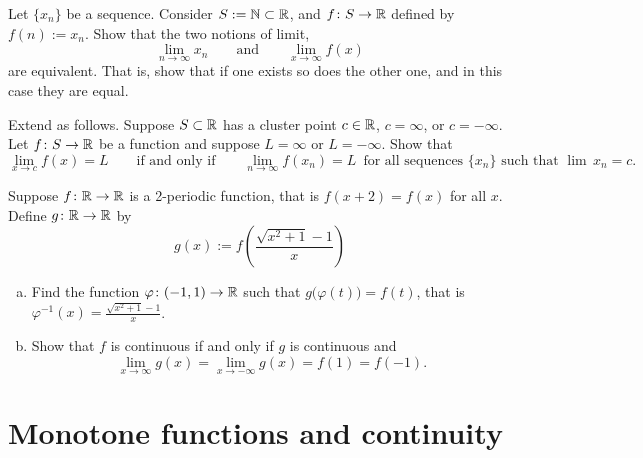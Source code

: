 \begin{exercise}
Let $\{ x_n \}$ be a sequence.  Consider $S := {\mathbb{N}} \subset {\mathbb{R}}$, and
$f \colon S \to {\mathbb{R}}$ defined by $f(n) := x_n$.  Show that
the two notions of limit,
\begin{equation*}
\lim_{n\to\infty} x_n \qquad \text{and} \qquad
\lim_{x\to\infty} f(x) 
\end{equation*}
are equivalent.  That is, show that if one exists so does
the other one, and in this case they are equal.
\end{exercise}

\begin{exercise}
Extend  as follows.
Suppose $S \subset {\mathbb{R}}$ has a cluster point $c \in {\mathbb{R}}$, $c = \infty$,
or $c = -\infty$.  Let $f \colon S \to {\mathbb{R}}$ be a function and suppose
$L = \infty$ or $L = -\infty$.  Show that
\begin{equation*}
\lim_{x\to c} f(x) = L \qquad \text{if and only if} \qquad
\lim_{n\to\infty} f(x_n) = L \enspace \text{for all sequences } \{ x_n \}
\text{ such that } \lim\, x_n = c .
\end{equation*}
\end{exercise}

\begin{exercise}
Suppose $f \colon {\mathbb{R}} \to {\mathbb{R}}$ is a 2-periodic function, that is $f(x +2) =
f(x)$ for all $x$.  Define $g \colon {\mathbb{R}} \to {\mathbb{R}}$ by 
\begin{equation*}
g(x) := f\left(\frac{\sqrt{x^2+1}-1}{x}\right)
\end{equation*}
\begin{enumerate}[a)]
\item
Find the function $\varphi \colon (-1,1) \to {\mathbb{R}}$ such that
$g\bigl(\varphi(t)\bigr) = f(t)$, that is $\varphi^{-1}(x) = 
\frac{\sqrt{x^2+1}-1}{x}$.
\item
Show that $f$ is continuous if and only if $g$ is continuous and
\begin{equation*}
\lim_{x \to \infty} g(x) = 
\lim_{x \to -\infty} g(x) = 
f(1) = f(-1) .
\end{equation*}
\end{enumerate}
\end{exercise}


\sectionnewpage
\section{Monotone functions and continuity}
\label{sec:monotonefunc}

